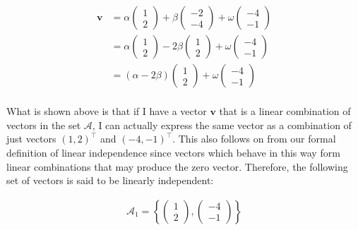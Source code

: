 \documentclass[12pt]{book}
\begin{document}
	 \begin{align}
	 	\mathbf{v} &= \alpha \begin{pmatrix} 1 \\ 2 \end{pmatrix} + \beta \begin{pmatrix} -2 \\ -4 \end{pmatrix} + \omega \begin{pmatrix} -4 \\ -1 \end{pmatrix} \\
	 	&= \alpha \begin{pmatrix} 1 \\ 2 \end{pmatrix} - 2\beta \begin{pmatrix} 1 \\ 2 \end{pmatrix} + \omega \begin{pmatrix} -4 \\ -1 \end{pmatrix} \\
	 	&= (\alpha - 2\beta) \begin{pmatrix} 1 \\ 2 \end{pmatrix} + \omega \begin{pmatrix} -4 \\ -1 \end{pmatrix} \\
	 \end{align}
 
 	What is shown above is that if I have a vector $\mathbf{v}$ that is a linear combination of vectors in the set $\mathcal{A}$, I can actually express the same vector as a combination of just vectors $(1, 2)^{\top}$ and $(-4, -1)^{\top}$. This also follows on from our formal definition of linear independence since vectors which behave in this way form linear combinations that may produce the zero vector. Therefore, the following set of vectors is said to be linearly independent:
 	
 	\begin{align}
 		\mathcal{A}_1 = \left\{\begin{pmatrix} 1 \\ 2 \end{pmatrix},\begin{pmatrix} -4 \\ -1 \end{pmatrix} \right\}
 	\end{align}
	
\end{document}
